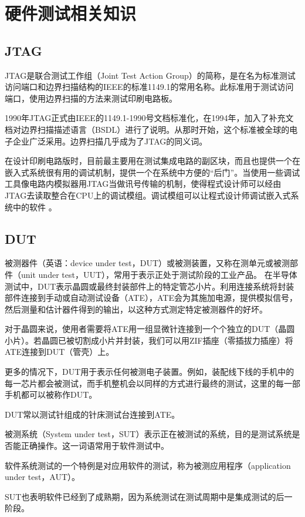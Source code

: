 \section{硬件测试相关知识}
\subsection{JTAG}
JTAG是联合测试工作组（Joint Test Action Group）的简称，是在名为标准测试访问端口和边界扫描结构的IEEE的标准1149.1的常用名称。此标准用于测试访问端口，使用边界扫描的方法来测试印刷电路板。

1990年JTAG正式由IEEE的1149.1-1990号文档标准化，在1994年，加入了补充文档对边界扫描描述语言（BSDL）进行了说明。从那时开始，这个标准被全球的电子企业广泛采用。边界扫描几乎成为了JTAG的同义词。

在设计印刷电路版时，目前最主要用在测试集成电路的副区块，而且也提供一个在嵌入式系统很有用的调试机制，提供一个在系统中方便的``后门''。当使用一些调试工具像电路内模拟器用JTAG当做讯号传输的机制，使得程式设计师可以经由JTAG去读取整合在CPU上的调试模组。调试模组可以让程式设计师调试嵌入式系统中的软件 。

\subsection{DUT}
被测器件（英语：device under test，DUT）或被测装置，又称在测单元或被测部件（unit under test，UUT），常用于表示正处于测试阶段的工业产品。
在半导体测试中，DUT表示晶圆或最终封装部件上的特定管芯小片。利用连接系统将封装部件连接到手动或自动测试设备（ATE），ATE会为其施加电源，提供模拟信号，然后测量和估计器件得到的输出，以这种方式测定特定被测器件的好坏。

对于晶圆来说，使用者需要将ATE用一组显微针连接到一个个独立的DUT（晶圆小片）。若晶圆已被切割成小片并封装，我们可以用ZIF插座（零插拔力插座）将ATE连接到DUT（管壳）上。

更多的情况下，DUT用于表示任何被测电子装置。例如，装配线下线的手机中的每一芯片都会被测试，而手机整机会以同样的方式进行最终的测试，这里的每一部手机都可以被称作DUT。

DUT常以测试针组成的针床测试台连接到ATE。

被测系统（System under test，SUT）表示正在被测试的系统，目的是测试系统是否能正确操作。这一词语常用于软件测试中。

软件系统测试的一个特例是对应用软件的测试，称为被测应用程序（application under test，AUT）。

SUT也表明软件已经到了成熟期，因为系统测试在测试周期中是集成测试的后一阶段。
